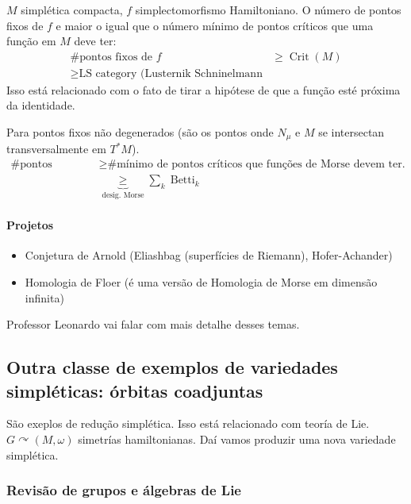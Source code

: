\begin{conjecture}[Arnold]
	$M$ simpl\'etica compacta, $f$ simplectomorfismo Hamiltoniano. O n\'umero de pontos fixos de $f$ e maior o igual que o n\'umero m\'inimo de pontos cr\'iticos que uma fun\c c\~ao em $M$ deve ter:
	\begin{align*}
		\text{\# pontos fixos de $f$}&\geq \operatorname{Crit}(M)\\
		\geq  \text{LS category (Lusternik Schninelmann} 
	\end{align*}
Isso est\'a relacionado com o fato de tirar a hip\'otese de que a fun\c c\~ao est\'e pr\'oxima da identidade.
\end{conjecture}

\begin{conjecture}
	Para pontos fixos n\~ao degenerados (s\~ao os pontos onde $N_\mu$ e  $M$ se intersectan transversalmente em $T^*M$).
	\begin{align*}
		\text{\# pontos cr\'iticos} &\geq \text{\# m\'inimo de pontos cr\'iticos que fun\c c\~oes de Morse devem ter.}\\
		&\underbrace{\geq }_{\text{desig. Morse} } \sum_{k}\operatorname{Betti}_{k}
	\end{align*}
\end{conjecture}

\paragraph{Projetos} 
\begin{itemize}
\item Conjetura de Arnold (Eliashbag (superf\'icies de Riemann), Hofer-Achander)
\item Homologia de Floer (\'e uma vers\~ao de Homologia de Morse em dimens\~ao infinita)
\end{itemize}

Professor Leonardo vai falar com mais detalhe desses temas.

\subsection{Outra classe de exemplos de variedades simpl\'eticas: \'orbitas coadjuntas}

S\~ao exeplos de redu\c c\~ao simpl\'etica. Isso est\'a relacionado com teor\'ia de Lie. $G \curvearrowright (M,\omega)$ simetr\'ias hamiltonianas. Da\'i vamos produzir uma nova variedade simpl\'etica.

\subsubsection{Revis\~ao de grupos e \'algebras de Lie}

